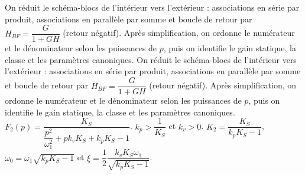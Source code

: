 \begin{corrigebox}[Corrigé]
On réduit le schéma-blocs de l'intérieur vers l'extérieur : associations en série par produit, associations en parallèle par somme et boucle de retour par $H_{BF}=\dfrac{G}{1+GH}$ (retour négatif). Après simplification, on ordonne le numérateur et le dénominateur selon les puissances de $p$, puis on identifie le gain statique, la classe et les paramètres canoniques.
On réduit le schéma-blocs de l'intérieur vers l'extérieur : associations en série par produit, associations en parallèle par somme et boucle de retour par $H_{BF}=\dfrac{G}{1+GH}$ (retour négatif). Après simplification, on ordonne le numérateur et le dénominateur selon les puissances de $p$, puis on identifie le gain statique, la classe et les paramètres canoniques.
$F_2(p)=\dfrac{K_S}{\dfrac{p^2}{\omega_1^2}+pk_v K_S +k_pK_S - 1}$.
$k_p>\dfrac{1}{K_S}$ et $k_v>0$.
$K_2 = \dfrac{K_S}{k_p K_S - 1}$, $\omega_0 = \omega_1\sqrt{k_p K_S - 1}$ et $\xi = \dfrac{1}{2}\dfrac{k_vK_S\omega_1}{\sqrt{k_p K_S - 1}}$.
%
%
%
\end{corrigebox}
